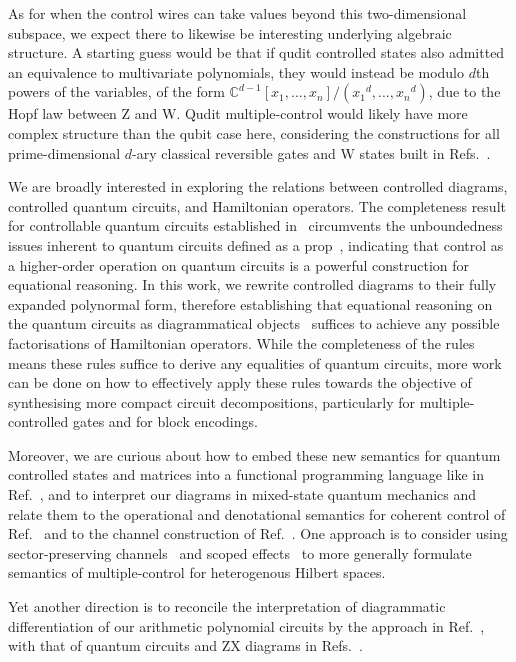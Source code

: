 As for when the control wires can take values beyond this two-dimensional subspace, we expect there to likewise be interesting underlying algebraic structure.
A starting guess would be that if qudit controlled states also admitted an equivalence to multivariate polynomials, they would instead be modulo $d$th powers of the variables, of the form $\mathbb{C}^{d-1}[x_1,...,x_n]/({x_1}^d,...,{x_n}^d)$, due to the Hopf law between Z and W.
Qudit multiple-control would likely have more complex structure than the qubit case here, considering the constructions for all prime-dimensional $d$-ary classical reversible gates and W states built in Refs.~\cite{Yeh2022QutritCtrl, Roy2023quditzh, Yeh2023quditW}.

We are broadly interested in exploring the relations between controlled diagrams, controlled quantum circuits, and Hamiltonian operators.
The completeness result for controllable quantum circuits established in~\cite{delorme2026ctrl} circumvents the unboundedness issues inherent to quantum circuits defined as a prop~\cite{clement2024minqc}, indicating that control as a higher-order operation on quantum circuits is a powerful construction for equational reasoning. In this work, we rewrite controlled diagrams to their fully expanded polynormal form, therefore establishing that equational reasoning on the quantum circuits as diagrammatical objects~\cite{shaikh2022sum} suffices to achieve any possible factorisations of Hamiltonian operators.
While the completeness of the rules means these rules suffice to derive any equalities of quantum circuits, more work can be done on how to effectively apply these rules towards the objective of synthesising more compact circuit decompositions, particularly for multiple-controlled gates and for block encodings.

Moreover, we are curious about how to embed these new semantics for quantum controlled states and matrices into a functional programming language like in Ref.~\cite{rennela2020clctrllinlogic}, and to interpret our diagrams in mixed-state quantum mechanics and relate them to the operational and denotational semantics for coherent control of Ref.~\cite{barsse2025qplcoherent} and to the channel construction of Ref.~\cite{deFelice2026dataflow}.
One approach is to consider using sector-preserving channels~\cite{Vanrietvelde2021ctrlsector} and scoped effects~\cite{lindley2024scoped} to more generally formulate semantics of multiple-control for heterogenous Hilbert spaces.

Yet another direction is to reconcile the interpretation of diagrammatic differentiation of our arithmetic polynomial circuits by the approach in Ref.~\cite{wilson2023diffpolycirc}, with that of quantum circuits and ZX diagrams in Refs.~\cite{toumi2021diagdiff, Wang2024diffintzx, jeandel2024adddiffzx}.